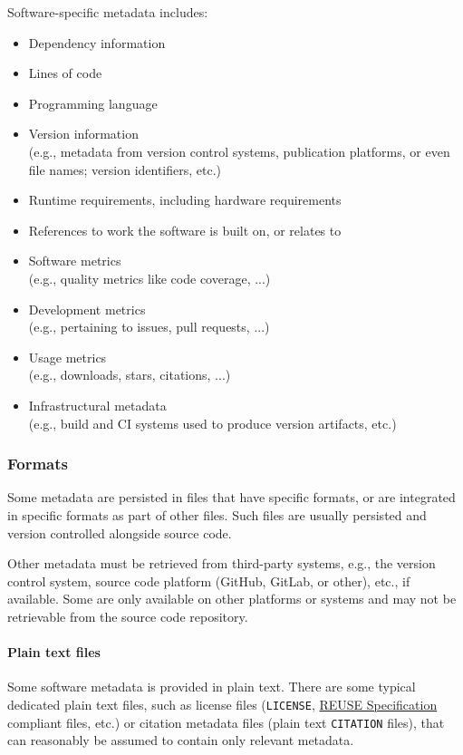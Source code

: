 \documentclass[11pt,a4paper]{scrartcl}
\newcommand{\fn}[1]{\texttt{#1}}
\begin{document}
\begin{multicols}{2}
    Software-specific metadata includes:
    \begin{itemize}  
        \item Dependency information
        \item Lines of code
        \item Programming language
        \item Version information \\ {\small (e.g., metadata from version control systems, publication platforms, or even file names; version identifiers, etc.)}
        \item Runtime requirements, including hardware requirements
        \item References to work the software is built on, or relates to
        \item Software metrics \\ {\small (e.g., quality metrics like code coverage, ...)}
        \item Development metrics \\ {\small (e.g., pertaining to issues, pull requests, ...)}
        \item Usage metrics \\ {\small (e.g., downloads, stars, citations, ...)}
        \item Infrastructural metadata \\ {\small (e.g., build and CI systems used to produce version artifacts, etc.)}
    \end{itemize}
\end{multicols}





\subsubsection{Formats}\label{subsubsec:metadata-formats}
Some metadata are persisted in files that have specific formats, or are integrated in specific formats as part of other files.
Such files are usually persisted and version controlled alongside source code. 

Other metadata must be retrieved from third-party systems, e.g., the version control system, source code platform
(GitHub, GitLab, or other), etc., if available. Some are only available on other platforms or systems and may not be
retrievable from the source code repository.

\paragraph{Plain text files}\label{par:metadata-formats-plaintext}
Some software metadata is provided in plain text. There are some typical dedicated plain text files, such as license files
(\fn{LICENSE}, \href{https://reuse.software/spec/}{REUSE Specification} compliant files, etc.) or
citation metadata files (plain text \fn{CITATION} files), that can reasonably be assumed to contain only relevant metadata. 
\end{document}
